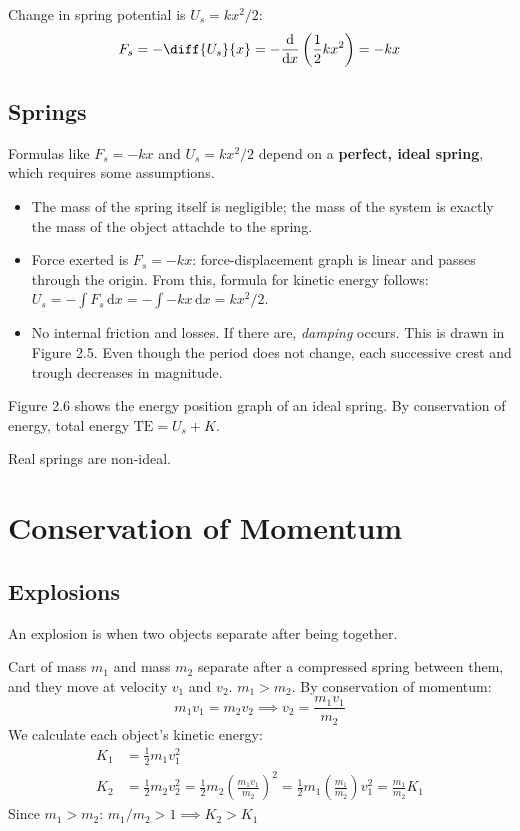 \documentclass{article}
\newcommand{\definition}[1]{\begin{tcolorbox}[colback=red!5!white,colframe=red!75!black,parbox=false] #1 \end{tcolorbox}}
\newcommand{\example}[2]{\begin{tcolorbox}[title={Example: #1},colback=brown!5!white,colframe=brown!75!black,parbox=false] #2 \end{tcolorbox}}
\newcommand*{\deriv}[1][x]{\ensuremath{\dfrac{\mathrm{d}}{\mathrm{d}#1}}}
\begin{document}
\example{Spring potential}{
	Change in spring potential is $U_s=kx^2/2$:
	\begin{equation*}
		F_s=-\diff{U_s}{x}=-\deriv[x]\left(\frac12kx^2\right)=-kx
	\end{equation*}
}

\subsection{Springs}

Formulas like $F_s=-kx$ and $U_s=kx^2/2$ depend on a \textbf{perfect, ideal spring}, which requires some assumptions.
\begin{itemize}
	\item The mass of the spring itself is negligible; the mass of the system is exactly the mass of the object attachde to the spring.
	\item Force exerted is $F_s=-kx$: force-displacement graph is linear and passes through the origin. From this, formula for kinetic energy follows: $U_s=-\int F_s\,\mathrm{d}x=-\int -kx\,\mathrm{d}x=kx^2/2$.
	\item No internal friction and losses. If there are, \textit{damping} occurs. This is drawn in Figure 2.5. Even though the period does not change, each successive crest and trough decreases in magnitude.
\end{itemize}

Figure 2.6 shows the energy position graph of an ideal spring. By conservation of energy, total energy $\text{TE}=U_s+K$.

Real springs are non-ideal.

\section{Conservation of Momentum}

\subsection{Explosions}

\definition{An explosion is when two objects separate after being together.}

Cart of mass $m_1$ and mass $m_2$ separate after a compressed spring between them, and they move at velocity $v_1$ and $v_2$. $m_1>m_2$. By conservation of momentum:
\begin{equation*}
    m_1v_1=m_2v_2
	\implies v_2=\frac{m_1v_1}{m_2}
\end{equation*}
We calculate each object's kinetic energy:
\begin{align*}
	K_1&=\frac12m_1v_1^2 \\
	K_2&=\frac12m_2v_2^2
	   =\frac12m_2 \left( \frac{m_1v_1}{m_2} \right)^2
	   =\frac12 m_1\left(\frac{m_1}{m_2}\right)v_1^2
	   =\frac{m_1}{m_2}K_1
\end{align*}
Since $m_1>m_2$: $m_1/m_2>1\implies K_2>K_1$
\end{document}
